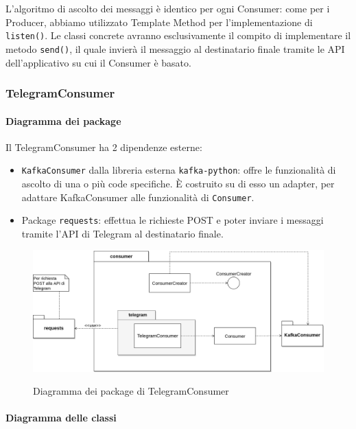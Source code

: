 L'algoritmo di ascolto dei messaggi è identico per ogni Consumer: come per i Producer, abbiamo utilizzato
Template Method per l'implementazione di \texttt{listen()}.
Le classi concrete avranno esclusivamente il compito di implementare il metodo \texttt{send()}, il quale invierà il messaggio
al destinatario finale tramite le API dell'applicativo su cui il Consumer è basato.


\subsubsection{TelegramConsumer}

\paragraph{Diagramma dei package}

Il TelegramConsumer ha 2 dipendenze esterne:
\begin{itemize}
    \item \texttt{KafkaConsumer} dalla libreria esterna \texttt{kafka-python}: offre le funzionalità di ascolto
        di una o più code specifiche. È costruito su di esso un adapter, per adattare KafkaConsumer alle funzionalità
        di \texttt{Consumer}.
    \item Package \texttt{requests}: effettua le richieste POST e poter inviare i messaggi tramite l'API di Telegram
        al destinatario finale.
\end{itemize}

\begin{figure}[H]
    \centering
    \includegraphics[width=\textwidth]{img/Package-TelegramConsumer.png}\\
    \caption{Diagramma dei package di TelegramConsumer}
\end{figure}

\paragraph{Diagramma delle classi}

